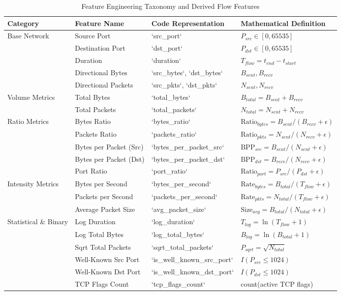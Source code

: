 \documentclass[journal]{IEEEtran}
\begin{document}
\begin{table}[t]
\centering
\caption{Feature Engineering Taxonomy and Derived Flow Features}
\label{tab:features}
\begin{tabular}{llll}
\toprule
\textbf{Category} & \textbf{Feature Name} & \textbf{Code Representation} & \textbf{Mathematical Definition} \\
\midrule
\multirow{5}{*}{Base Network} & Source Port & `src_port` & $P_{src} \in [0, 65535]$ \\
& Destination Port & `dst_port` & $P_{dst} \in [0, 65535]$ \\
& Duration & `duration` & $T_{flow} = t_{end} - t_{start}$ \\
& Directional Bytes & `src_bytes`, `dst_bytes` & $B_{sent}, B_{recv}$ \\
& Directional Packets & `src_pkts`, `dst_pkts` & $N_{sent}, N_{recv}$ \\
\midrule
\multirow{2}{*}{Volume Metrics} & Total Bytes & `total_bytes` & $B_{total} = B_{sent} + B_{recv}$ \\
& Total Packets & `total_packets` & $N_{total} = N_{sent} + N_{recv}$ \\
\midrule
\multirow{5}{*}{Ratio Metrics} & Bytes Ratio & `bytes_ratio` & $\text{Ratio}_{bytes} = B_{sent} / (B_{recv} + \epsilon)$ \\
& Packets Ratio & `packets_ratio` & $\text{Ratio}_{pkts} = N_{sent} / (N_{recv} + \epsilon)$ \\
& Bytes per Packet (Src) & `bytes_per_packet_src` & $\text{BPP}_{src} = B_{sent} / (N_{sent} + \epsilon)$ \\
& Bytes per Packet (Dst) & `bytes_per_packet_dst` & $\text{BPP}_{dst} = B_{recv} / (N_{recv} + \epsilon)$ \\
& Port Ratio & `port_ratio` & $\text{Ratio}_{port} = P_{src} / (P_{dst} + \epsilon)$ \\
\midrule
\multirow{3}{*}{Intensity Metrics} & Bytes per Second & `bytes_per_second` & $\text{Rate}_{bytes} = B_{total} / (T_{flow} + \epsilon)$ \\
& Packets per Second & `packets_per_second` & $\text{Rate}_{pkts} = N_{total} / (T_{flow} + \epsilon)$ \\
& Average Packet Size & `avg_packet_size` & $\text{Size}_{avg} = B_{total} / (N_{total} + \epsilon)$ \\
\midrule
\multirow{6}{*}{Statistical \& Binary} & Log Duration & `log_duration` & $T_{log} = \ln(T_{flow} + 1)$ \\
& Log Total Bytes & `log_total_bytes` & $B_{log} = \ln(B_{total} + 1)$ \\
& Sqrt Total Packets & `sqrt_total_packets` & $P_{sqrt} = \sqrt{N_{total}}$ \\
& Well-Known Src Port & `is_well_known_src_port` & $I(P_{src} \le 1024)$ \\
& Well-Known Dst Port & `is_well_known_dst_port` & $I(P_{dst} \le 1024)$ \\
& TCP Flags Count & `tcp_flags_count` & count(active TCP flags) \\
\bottomrule
\end{tabular}
\end{table}
\end{document}
